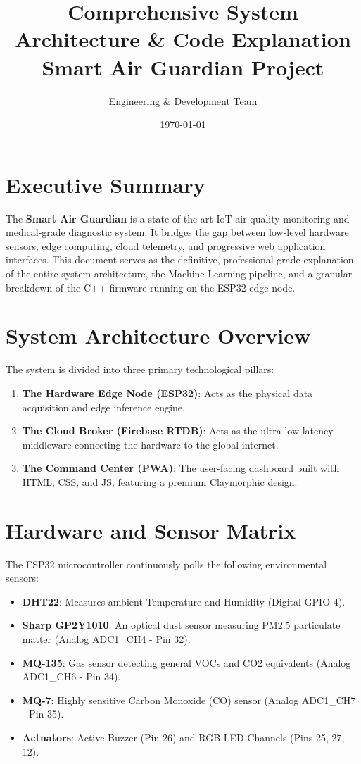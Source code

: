 \documentclass[12pt,a4paper]{article}
\title{\Huge \textbf{Comprehensive System Architecture \& Code Explanation} \\ \vspace{0.5cm} \Large Smart Air Guardian Project}
\author{Engineering \& Development Team}
\date{\today}
\begin{document}
\maketitle
\tableofcontents
\newpage

\section{Executive Summary}
The \textbf{Smart Air Guardian} is a state-of-the-art IoT air quality monitoring and medical-grade diagnostic system. It bridges the gap between low-level hardware sensors, edge computing, cloud telemetry, and progressive web application interfaces. This document serves as the definitive, professional-grade explanation of the entire system architecture, the Machine Learning pipeline, and a granular breakdown of the C++ firmware running on the ESP32 edge node.

\section{System Architecture Overview}
The system is divided into three primary technological pillars:
\begin{enumerate}
    \item \textbf{The Hardware Edge Node (ESP32)}: Acts as the physical data acquisition and edge inference engine.
    \item \textbf{The Cloud Broker (Firebase RTDB)}: Acts as the ultra-low latency middleware connecting the hardware to the global internet.
    \item \textbf{The Command Center (PWA)}: The user-facing dashboard built with HTML, CSS, and JS, featuring a premium Claymorphic design.
\end{enumerate}

\section{Hardware and Sensor Matrix}
The ESP32 microcontroller continuously polls the following environmental sensors:
\begin{itemize}
    \item \textbf{DHT22}: Measures ambient Temperature and Humidity (Digital GPIO 4).
    \item \textbf{Sharp GP2Y1010}: An optical dust sensor measuring PM2.5 particulate matter (Analog ADC1\_CH4 - Pin 32).
    \item \textbf{MQ-135}: Gas sensor detecting general VOCs and CO2 equivalents (Analog ADC1\_CH6 - Pin 34).
    \item \textbf{MQ-7}: Highly sensitive Carbon Monoxide (CO) sensor (Analog ADC1\_CH7 - Pin 35).
    \item \textbf{Actuators}: Active Buzzer (Pin 26) and RGB LED Channels (Pins 25, 27, 12).
\end{itemize}
\end{document}
